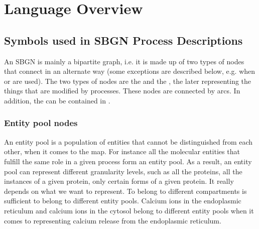 \chapter{Language Overview}

\section{Symbols used in SBGN Process Descriptions}
\label{chp:symbols}

An SBGN \PDm is mainly a bipartite graph, i.e. it is made up of two types of nodes that connect in an alternate way (some exceptions are described below, e.g. when \hyperref[sec:logic]{} or  are used). The two types of nodes are the \hyperref[sec:PNs]{} and the \hyperref[sec:EPNs]{}, the later  representing the things that are modified by processes. These nodes are connected by arcs. In addition, the  can be contained in  \hyperref[sec:compartment]{}. %


\subsection{Entity pool nodes}\label{sec:EPNs}

An entity pool is a population of entities that cannot be distinguished from each other, when it comes to the \SBGNPDLone map. For instance all the molecular entities that fulfill the same role in a given process form an entity pool. As a result, an entity pool can represent different granularity levels, such as all the proteins, all the instances of a given protein, only certain forms of a given protein. It really depends on what we want to represent. To belong to different compartments is sufficient to belong to different entity pools. Calcium ions in the endoplasmic reticulum and calcium ions in the cytosol belong to different entity pools when it comes to representing calcium release from the endoplasmic reticulum.

